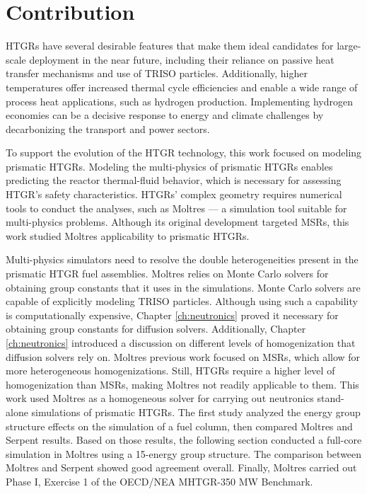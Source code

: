 \section{Contribution}

HTGRs have several desirable features that make them ideal candidates for large-scale deployment in the near future, including their reliance on passive heat transfer mechanisms and use of TRISO particles.
Additionally, higher temperatures offer increased thermal cycle efficiencies and enable a wide range of process heat applications, such as hydrogen production.
Implementing hydrogen economies can be a decisive response to energy and climate challenges by decarbonizing the transport and power sectors.

To support the evolution of the HTGR technology, this work focused on modeling prismatic HTGRs.
Modeling the multi-physics of prismatic HTGRs enables predicting the reactor thermal-fluid behavior, which is necessary for assessing HTGR's safety characteristics.
HTGRs' complex geometry requires numerical tools to conduct the analyses, such as Moltres --- a simulation tool suitable for multi-physics problems.
Although its original development targeted MSRs, this work studied Moltres applicability to prismatic HTGRs.

Multi-physics simulators need to resolve the double heterogeneities present in the prismatic HTGR fuel assemblies.
Moltres relies on Monte Carlo solvers for obtaining group constants that it uses in the simulations.
Monte Carlo solvers are capable of explicitly modeling TRISO particles.
Although using such a capability is computationally expensive, Chapter \ref{ch:neutronics} proved it necessary for obtaining group constants for diffusion solvers.
Additionally, Chapter \ref{ch:neutronics} introduced a discussion on different levels of homogenization that diffusion solvers rely on.
Moltres previous work focused on MSRs, which allow for more heterogeneous homogenizations.
Still, HTGRs require a higher level of homogenization than MSRs, making Moltres not readily applicable to them.
This work used Moltres as a homogeneous solver for carrying out neutronics stand-alone simulations of prismatic HTGRs.
The first study analyzed the energy group structure effects on the simulation of a fuel column, then compared Moltres and Serpent results.
Based on those results, the following section conducted a full-core simulation in Moltres using a 15-energy group structure.
The comparison between Moltres and Serpent showed good agreement overall.
Finally, Moltres carried out Phase I, Exercise 1 of the OECD/NEA MHTGR-350 MW Benchmark.

